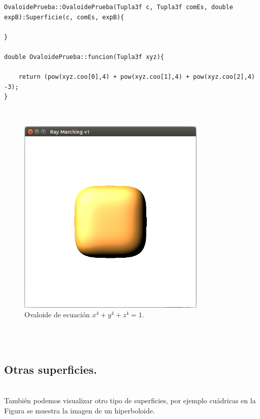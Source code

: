 \begin{lstlisting}[style=Consola]
OvaloidePrueba::OvaloidePrueba(Tupla3f c, Tupla3f comEs, double expB):Superficie(c, comEs, expB){

}

double OvaloidePrueba::funcion(Tupla3f xyz){

	return (pow(xyz.coo[0],4) + pow(xyz.coo[1],4) + pow(xyz.coo[2],4) -3);
}
\end{lstlisting}
${ }$\\

\begin{figure}[h]
	\begin{center}
		\includegraphics[width=0.8\textwidth]{imagenes/Ovaloid.png}
	\end{center}
	\caption{Ovaloide de ecuación $x^4 + y^4 + z^4 = 1$.}
	\label{fig:etiq_12}
\end{figure}
${ }$\\


${ }$\\
\subsection{Otras superficies.}
${ }$\\

También podemos visualizar otro tipo de superficies, por ejemplo cuádricas en la Figura se muestra la imagen de un hiperboloide.
${ }$\\


